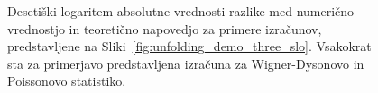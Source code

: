 \documentclass[10pt,a4paper]{article}
\begin{document}
\begin{figure}[H]
\caption{Desetiški logaritem absolutne vrednosti razlike med numerično vrednostjo in teoretično napovedjo za primere izračunov, predstavljene na Sliki~\ref{fig:unfolding_demo_three_slo}. Vsakokrat sta za primerjavo predstavljena izračuna za Wigner-Dysonovo in Poissonovo statistiko. }
\label{fig:unfolding_demo_three_error_slo}
\end{figure}
\end{document}
